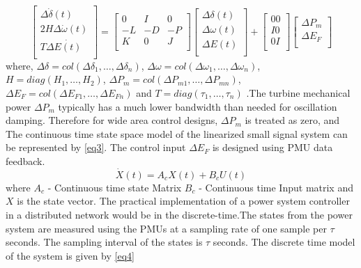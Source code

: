 \documentclass[a4paper]{article}
\begin{document}
\begin{equation}
\label{eq2}
\begin{bmatrix}
{\Delta}\dot{{\delta}}(t)\\
2H{\Delta}\dot{{\omega}}(t)\\
T{\Delta}\dot{E(t)}\\
\end{bmatrix} =
\begin{bmatrix}
0 &I &0\\
-L &-D &-P\\
K &0 &J\\
\end{bmatrix}
\begin{bmatrix}
{\Delta}{\delta}(t)\\
{\Delta}{\omega}(t)\\
{\Delta}E(t)\\
\end{bmatrix} +
\begin{bmatrix}
0 0\\
I 0\\
0 I\\
\end{bmatrix}
\begin{bmatrix}
\Delta P_{m}\\
\Delta E	_{F}\\
\end{bmatrix}
\end{equation}
where, $\Delta{\delta} = col(\Delta{\delta}_{1},\ldots,\Delta{\delta}_{n})$, $\Delta{\omega} = col(\Delta{\omega}_{1},\ldots,\Delta{\omega}_{n})$, $H = diag(H_{1},\ldots,H_{2})$, $\Delta P_{m} = col(\Delta P_{m1},\ldots,\Delta P_{mn})$, $\Delta E_{F} = col(\Delta E_{F1},\ldots,\Delta E_{Fn})$ and $T = diag(\tau_{1},\ldots,\tau_{n})$ .The turbine mechanical power $\Delta P_{m}$ typically has a much lower bandwidth than needed for oscillation damping. Therefore for wide area control designs, $\Delta P_{m}$ is treated as zero, and   The continuous time state space model of the linearized small signal system can be represented by \eqref{eq3}. The control input $\Delta E_{F}$ is designed using PMU data feedback.
\begin{equation}\label{eq3} \dot{X}(t) = A_{c}X(t) +B_{c}U(t) \end{equation}
where $A_{c}$ - Continuous time state Matrix $B_{c}$ - Continuous time Input matrix and $X$ is the state vector.
The practical implementation of a power system controller in a distributed network would be in the discrete-time.The states from the power system are measured using the PMUs at a sampling rate of one sample per $\tau$ seconds. The sampling interval of the states is $\tau$ seconds. The discrete time model of the system is given by \eqref{eq4}
\end{document}
